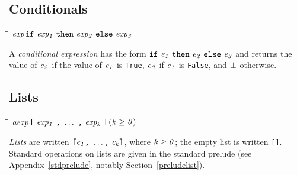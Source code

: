 \subsection{Conditionals}
\label{conditionals}
%
\begin{flushleft}\it\begin{tabbing}
\hspace{0.5in}\=\hspace{3.0in}\=\kill
$\it exp$\>\makebox[3.5em]{$\rightarrow$}$\it \makebox{\tt if}\ exp_1\ \makebox{\tt then}\ exp_2\ \makebox{\tt else}\ exp_3$
\end{tabbing}\end{flushleft}
%
A {\em conditional expression}
has the form 
\mbox{$\it \makebox{\tt if}\ e_1\ \makebox{\tt then}\ e_2\ \makebox{\tt else}\ e_3$} and returns the value of \mbox{$\it e_2$} if the
value of \mbox{$\it e_1$} is \mbox{\tt True}, \mbox{$\it e_3$} if \mbox{$\it e_1$} is \mbox{\tt False}, and \mbox{$\it \bot$}
otherwise.


\subsection{Lists}
\label{lists}
%
\begin{flushleft}\it\begin{tabbing}
\hspace{0.5in}\=\hspace{3.0in}\=\kill
$\it aexp$\>\makebox[3.5em]{$\rightarrow$}$\it \makebox{\tt [}\ exp_1\ \makebox{\tt ,}\ \ldots \ \makebox{\tt ,}\ exp_k\ \makebox{\tt ]}$\>\makebox[3em]{}$\it (k\geq 0)$
\end{tabbing}\end{flushleft}
%
%
{\em Lists} are written \mbox{$\it \makebox{\tt [}e_1\makebox{\tt ,}\ \ldots \makebox{\tt ,}\ e_k\makebox{\tt ]}$}, where
\mbox{$\it k\geq 0$}; the empty list is written \mbox{\tt []}.  Standard operations on
lists are given in the standard prelude (see
Appendix~\ref{stdprelude}, notably Section~\ref{preludelist}).

